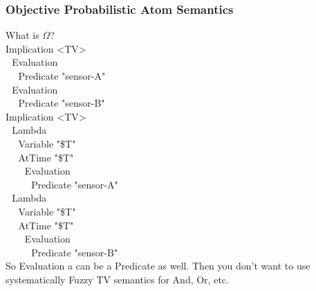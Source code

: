 \documentclass{beamer}
\begin{document}
\frame
{
  \frametitle{Objective Probabilistic Atom Semantics}

  {\tiny

  What is $\Omega$?\\[.5cm]

  Implication <TV>\\
  $\ \ \ $Evaluation\\
  $\ \ \ $$\ \ \ $Predicate "sensor-A"\\
  $\ \ \ $Evaluation\\
  $\ \ \ $$\ \ \ $Predicate "sensor-B"\\[.5cm]

  Implication <TV>\\
  $\ \ \ $Lambda\\
  $\ \ \ $$\ \ \ $Variable "\$T"\\
  $\ \ \ $$\ \ \ $AtTime "\$T"\\
  $\ \ \ $$\ \ \ $$\ \ \ $Evaluation\\
  $\ \ \ $$\ \ \ $$\ \ \ $$\ \ \ $Predicate "sensor-A"\\
  $\ \ \ $Lambda\\
  $\ \ \ $$\ \ \ $Variable "\$T"\\
  $\ \ \ $$\ \ \ $AtTime "\$T"\\
  $\ \ \ $$\ \ \ $$\ \ \ $Evaluation\\
  $\ \ \ $$\ \ \ $$\ \ \ $$\ \ \ $Predicate "sensor-B"\\[.5cm]

  So Evaluation a can be a Predicate as well. Then you don't want to
  use systematically Fuzzy TV semantics for And, Or, etc.

  }
}
\end{document}
